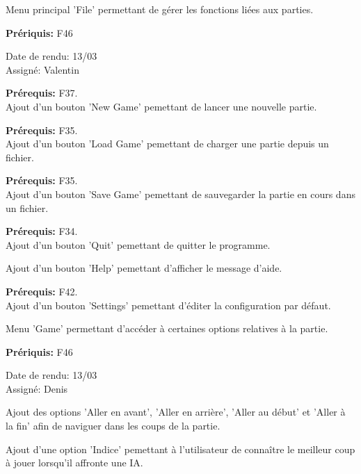 \documentclass{article}
\begin{document}
\begin{needbox}
    Menu principal 'File' permettant de gérer les fonctions liées aux parties.

    \textbf{Prériquis:} F46
    \begin{duedatebox}
        Date de rendu: 13/03\\
        Assigné: Valentin
    \end{duedatebox}
    \begin{subneedbox}
        \textbf{Prérequis:} F37.\\
        Ajout d'un bouton 'New Game' pemettant de lancer une nouvelle partie.
    \end{subneedbox}
    \begin{subneedbox}
        \textbf{Prérequis:} F35.\\
        Ajout d'un bouton 'Load Game' pemettant de charger une partie depuis un fichier.
    \end{subneedbox}
    \begin{subneedbox}
        \textbf{Prérequis:} F35.\\
        Ajout d'un bouton 'Save Game' pemettant de sauvegarder la partie en cours dans un fichier.
    \end{subneedbox}
    \begin{subneedbox}[F47.4: Quit]
        \textbf{Prérequis:} F34.\\
        Ajout d'un bouton 'Quit' pemettant de quitter le programme.
    \end{subneedbox}
    \begin{subneedbox}[F47.5: Help]
        Ajout d'un bouton 'Help' pemettant d'afficher le message d'aide.
    \end{subneedbox}
    \begin{subneedbox}[F47.6: Settings]
        \textbf{Prérequis:} F42.\\
        Ajout d'un bouton 'Settings' pemettant d'éditer la configuration par défaut.
    \end{subneedbox}
\end{needbox}

\begin{needbox}
    Menu 'Game' permettant d'accéder à certaines options relatives à la partie.

    \textbf{Prériquis:} F46
    \begin{duedatebox}
        Date de rendu: 13/03\\
        Assigné: Denis
    \end{duedatebox}
    \begin{subneedbox}
        Ajout des options 'Aller en avant', 'Aller en arrière', 'Aller au début' et 'Aller à la fin' afin de naviguer dans
        les coups de la partie.
    \end{subneedbox}
    \begin{subneedbox}[F48.2: Indice]
        Ajout d'une option 'Indice' pemettant à l'utilisateur de connaître le meilleur coup à jouer lorsqu'il
        affronte une IA.
    \end{subneedbox}
\end{needbox}
\end{document}
